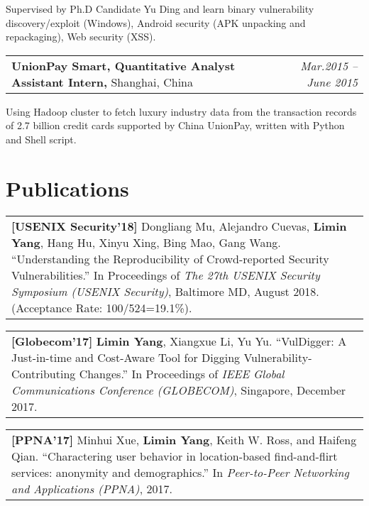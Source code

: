 \documentclass[a4paper,10pt]{article}
\newenvironment{packed_itemize}{
\begin{list}{\labelitemi}{\leftmargin=2em}
\setlength{\itemsep}{0pt}
\setlength{\parskip}{0pt}
\setlength{\parsep}{0pt}
\setlength{\headsep}{0pt}
\setlength{\topskip}{0pt}
\setlength{\topmargin}{0pt}
\setlength{\topsep}{0pt}
\setlength{\partopsep}{0pt}
}{\end{list}}
\begin{document}
\begin{packed_itemize}
\item Supervised by Ph.D Candidate Yu Ding and learn binary vulnerability discovery/exploit
(Windows), Android security (APK unpacking and repackaging), Web security (XSS).
\end{packed_itemize}

\begin{tabular}{p{15cm}r}
\textbf{UnionPay Smart, Quantitative Analyst Assistant Intern,} Shanghai, China & \emph{Mar.2015 – June 2015} \\
\end{tabular}

\begin{packed_itemize}
\item Using Hadoop cluster to fetch luxury industry data from the transaction records of 2.7 billion
credit cards supported by China UnionPay, written with Python and Shell script.
\end{packed_itemize}
\vspace{-0.2cm}

\section{Publications}
\vspace{-0.2cm}
\begin{tabular}{p{18cm}}
\textbf{[USENIX Security'18]} Dongliang Mu, Alejandro Cuevas, \textbf{Limin Yang}, Hang Hu, Xinyu Xing, Bing Mao, Gang Wang. ``Understanding the Reproducibility of Crowd-reported Security Vulnerabilities.'' In Proceedings of \textit{The 27th USENIX Security Symposium (USENIX Security)}, Baltimore MD, August 2018. (Acceptance Rate: 100/524=19.1\%).
\end{tabular}
\vspace{-0.1cm}

\begin{tabular}{p{18cm}}
\textbf{[Globecom'17]} \textbf{Limin Yang}, Xiangxue Li, Yu Yu. ``VulDigger: A Just-in-time and Cost-Aware Tool for Digging Vulnerability-Contributing Changes.'' In Proceedings of \textit{IEEE Global Communications Conference (GLOBECOM)}, Singapore, December 2017.
\end{tabular}
\vspace{-0.1cm}

\begin{tabular}{p{18cm}}
\textbf{[PPNA'17]} Minhui Xue, \textbf{Limin Yang}, Keith W. Ross, and Haifeng Qian. ``Charactering user behavior in location-based find-and-flirt services: anonymity and demographics.'' In \textit{Peer-to-Peer Networking and Applications (PPNA)}, 2017.
\end{tabular}
\vspace{-0.2cm}
\end{document}
